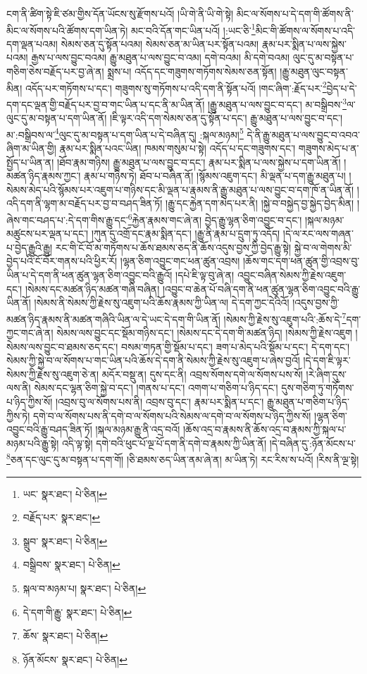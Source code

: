 ངག་ནི་ཚིག་སྟེ་ཇི་ཙམ་གྱིས་དོན་ཡོངས་སུ་རྫོགས་པའོ། །ཡི་གེ་ནི་ཡི་གེ་སྟེ། མིང་ལ་སོགས་པ་དེ་དག་གི་ཚོགས་ནི་མིང་ལ་སོགས་པའི་ཚོགས་དག་ཡིན་ཏེ། མང་བའི་དོན་གང་ཡིན་པའོ། །:ཡང་ཅི་\footnote{ཡང་  སྣར་ཐང་།  པེ་ཅིན། }མིང་གི་ཚོགས་ལ་སོགས་པ་འདི་དག་ལྡན་པའམ། སེམས་ཅན་དུ་སྟོན་པའམ། སེམས་ཅན་མ་ཡིན་པར་སྟོན་པའམ། རྣམ་པར་སྨིན་པ་ལས་སྐྱེས་པའམ། རྒྱས་པ་ལས་བྱུང་བའམ། རྒྱུ་མཐུན་པ་ལས་བྱུང་བ་འམ། དགེ་བའམ། མི་དགེ་བའམ། ལུང་དུ་མ་བསྟན་པ་གཅིག་ཅེས་བརྗོད་པར་བྱ་ཞེ་ན། སྨྲས་པ། འདོད་དང་གཟུགས་གཏོགས་སེམས་ཅན་སྟོན། །རྒྱུ་མཐུན་ལུང་བསྟན་མིན། འདོད་པར་གཏོགས་པ་དང་། གཟུགས་སུ་གཏོགས་པ་འདི་དག་ནི་སྟོན་པའོ། །གང་ཞིག་:རྗོད་པར་\footnote{བརྗོད་པར་  སྣར་ཐང་། }བྱེད་པ་དེ་དག་དང་ལྡན་གྱི་བརྗོད་པར་བྱ་བ་གང་ཡིན་པ་དང་ནི་མ་ཡིན་ནོ། །རྒྱུ་མཐུན་པ་ལས་བྱུང་བ་དང་། མ་བསྒྲིབས་\footnote{སྒྲུབ་  སྣར་ཐང་།  པེ་ཅིན། }ལ་ལུང་དུ་མ་བསྟན་པ་དག་ཡིན་ནོ། །ཇི་ལྟར་འདི་དག་སེམས་ཅན་དུ་སྟོན་པ་དང་། རྒྱུ་མཐུན་པ་ལས་བྱུང་བ་དང་། མ་:བསྒྲིབས་ལ་\footnote{བསྒྲིབས་  སྣར་ཐང་།  པེ་ཅིན། }ལུང་དུ་མ་བསྟན་པ་དག་ཡིན་པ་དེ་བཞིན་དུ། :སྐལ་མཉམ།\footnote{སྐལ་བ་མཉམ་པ།  སྣར་ཐང་།  པེ་ཅིན། } དེ་ནི་རྒྱུ་མཐུན་པ་ལས་བྱུང་བ་འབའ་ཞིག་མ་ཡིན་གྱི། རྣམ་པར་སྨིན་པའང་ཡིན། ཁམས་གསུམ་པ་སྟེ། འདོད་པ་དང་གཟུགས་དང་། གཟུགས་མེད་པ་ན་སྤྱོད་པ་ཡིན་ན། །ཐོབ་རྣམ་གཉིས། རྒྱུ་མཐུན་པ་ལས་བྱུང་བ་དང་། རྣམ་པར་སྨིན་པ་ལས་སྐྱེས་པ་དག་ཡིན་ནོ། །མཚན་ཉིད་རྣམས་ཀྱང་། རྣམ་པ་གཉིས་ཏེ། ཐོབ་པ་བཞིན་ནོ། །སྙོམས་འཇུག་དང་། མི་ལྡན་པ་དག་རྒྱུ་མཐུན་པ། །སེམས་མེད་པའི་སྙོམས་པར་འཇུག་པ་གཉིས་དང་མི་ལྡན་པ་རྣམས་ནི་རྒྱུ་མཐུན་པ་ལས་བྱུང་བ་དག་ཁོ་ན་ཡིན་ནོ། །འདི་དག་ནི་ལྷག་མ་བརྗོད་པར་བྱ་བ་བཤད་ཟིན་ཏོ། །རྒྱུ་དང་རྐྱེན་དག་མེད་པར་ནི། །སྐྱེ་བ་བསྐྱེད་བྱ་སྐྱེད་བྱེད་མིན། །ཞེས་གང་བཤད་པ་:དེ་དག་གིས་རྒྱུ་དང་\footnote{དེ་དག་གི་རྒྱུ་  སྣར་ཐང་།  པེ་ཅིན། }རྐྱེན་རྣམས་གང་ཞེ་ན། བྱེད་རྒྱུ་ལྷན་ཅིག་འབྱུང་བ་དང་། །སྐལ་མཉམ་མཚུངས་པར་ལྡན་པ་དང་། །ཀུན་དུ་འགྲོ་དང་རྣམ་སྨིན་དང་། །རྒྱུ་ནི་རྣམ་པ་དྲུག་ཏུ་འདོད། །དེ་ལ་རང་ལས་གཞན་པ་བྱེད་རྒྱུའི་རྒྱུ། རང་གི་ངོ་བོ་མ་གཏོགས་པ་ཆོས་ཐམས་ཅད་ནི་ཆོས་འདུས་བྱས་ཀྱི་བྱེད་རྒྱུ་སྟེ། སྐྱེ་བ་ལ་གེགས་མི་བྱེད་པའི་ངོ་བོར་གནས་པའི་ཕྱིར་རོ། །ལྷན་ཅིག་འབྱུང་གང་ཕན་ཚུན་འབྲས། །ཆོས་གང་དག་ཕན་ཚུན་གྱི་འབྲས་བུ་ཡིན་པ་དེ་དག་ནི་ཕན་ཚུན་ལྷན་ཅིག་འབྱུང་བའི་རྒྱུའོ། །དཔེ་ཇི་ལྟ་བུ་ཞེ་ན། འབྱུང་བཞིན་སེམས་ཀྱི་རྗེས་འཇུག་དང་། །སེམས་དང་མཚན་ཉིད་མཚན་གཞི་བཞིན། །འབྱུང་བ་ཆེན་པོ་བཞི་དག་ནི་ཕན་ཚུན་ལྷན་ཅིག་འབྱུང་བའི་རྒྱུ་ཡིན་ནོ། །སེམས་ནི་སེམས་ཀྱི་རྗེས་སུ་འཇུག་པའི་ཆོས་རྣམས་ཀྱི་ཡིན་ལ། དེ་དག་ཀྱང་དེའིའོ། །འདུས་བྱས་ཀྱི་མཚན་ཉིད་རྣམས་ནི་མཚན་གཞིའི་ཡིན་ལ་དེ་ཡང་དེ་དག་གི་ཡིན་ནོ། །སེམས་ཀྱི་རྗེས་སུ་འཇུག་པའི་:ཆོས་དེ་\footnote{ཆོས་  སྣར་ཐང་།  པེ་ཅིན། }དག་ཀྱང་གང་ཞེ་ན། སེམས་ལས་བྱུང་དང་སྡོམ་གཉིས་དང་། །སེམས་དང་དེ་དག་གི་མཚན་ཉིད། །སེམས་ཀྱི་རྗེས་འཇུག །སེམས་ལས་བྱུང་བ་ཐམས་ཅད་དང་། བསམ་གཏན་གྱི་སྡོམ་པ་དང་། ཟག་པ་མེད་པའི་སྡོམ་པ་དང་། དེ་དག་དང་། སེམས་ཀྱི་སྐྱེ་བ་ལ་སོགས་པ་གང་ཡིན་པའི་ཆོས་དེ་དག་ནི་སེམས་ཀྱི་རྗེས་སུ་འཇུག་པ་ཞེས་བྱའོ། །དེ་དག་ཇི་ལྟར་སེམས་ཀྱི་རྗེས་སུ་འཇུག་ཅེ་ན། མདོར་བསྡུ་ན། དུས་དང་ནི། འབྲས་སོགས་དགེ་ལ་སོགས་པས་སོ། །རེ་ཞིག་དུས་ལས་ནི། སེམས་དང་ལྷན་ཅིག་སྐྱེ་བ་དང་། །གནས་པ་དང་། འགག་པ་གཅིག་པ་ཉིད་དང་། དུས་གཅིག་ཏུ་གཏོགས་པ་ཉིད་ཀྱིས་སོ། །འབྲས་བུ་ལ་སོགས་པས་ནི། འབྲས་བུ་དང་། རྣམ་པར་སྨིན་པ་དང་། རྒྱུ་མཐུན་པ་གཅིག་པ་ཉིད་ཀྱིས་ཏེ། དགེ་བ་ལ་སོགས་པས་ནི་དགེ་བ་ལ་སོགས་པའི་སེམས་ལ་དགེ་བ་ལ་སོགས་པ་ཉིད་ཀྱིས་སོ། །ལྷན་ཅིག་འབྱུང་བའི་རྒྱུ་བཤད་ཟིན་ཏོ། །སྐལ་མཉམ་རྒྱུ་ནི་འདྲ་བའོ། །ཆོས་འདྲ་བ་རྣམས་ནི་ཆོས་འདྲ་བ་རྣམས་ཀྱི་སྐལ་པ་མཉམ་པའི་རྒྱུ་སྟེ། འདི་ལྟ་སྟེ། དགེ་བའི་ཕུང་པོ་ལྔ་པོ་དག་ནི་དགེ་བ་རྣམས་ཀྱི་ཡིན་ནོ། །དེ་བཞིན་དུ་:ཉོན་མོངས་པ་\footnote{ཉོན་མོངས་  སྣར་ཐང་།  པེ་ཅིན། }ཅན་དང་ལུང་དུ་མ་བསྟན་པ་དག་གོ། །ཅི་ཐམས་ཅད་ཡིན་ནམ་ཞེ་ན། མ་ཡིན་ཏེ། རང་རིས་ས་པའོ། །རིས་ནི་ལྔ་སྟེ། 